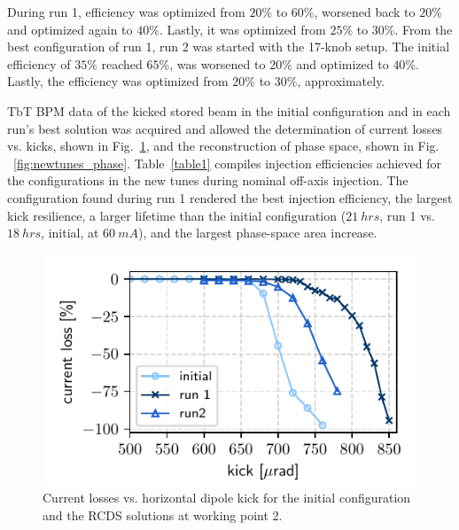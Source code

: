 \documentclass[a4paper,
               keeplastbox,   %
               ]{jacow}
\begin{document}
 During run 1, efficiency was optimized from $20\%$ to $60\%$, worsened back to $20\%$ and optimized again to $40\%$. Lastly, it was optimized from $25\%$ to $30\%$. From the best configuration  of run 1, run 2 was started with the 17-knob setup. The initial efficiency of $35\%$ reached $65\%$, was worsened to $20\%$ and optimized to $40\%$. Lastly, the efficiency was optimized from $20\%$ to $30\%$, approximately.

TbT BPM data of the kicked stored beam  in the initial configuration and in each run's best solution was acquired and allowed the determination of current losses vs. kicks, shown in Fig.~\ref{fig:loss_kicks_newtunes}, and the reconstruction of phase space, shown in Fig. ~\ref{fig:newtunes_phase}. Table~\ref{table1} compiles injection efficiencies achieved for the configurations in the new tunes during nominal off-axis injection. The configuration found during run 1 rendered the best injection efficiency, the largest kick resilience, a larger lifetime than the initial configuration ($21~\unit{hrs}$, run 1 vs. $18~\unit{hrs}$, initial, at $60~\unit{mA}$), and the largest phase-space area increase.
\begin{figure}[!h]
   \includegraphics[width=\columnwidth]{WEPL087_f3.pdf}
   \caption{Current losses vs. horizontal dipole kick for the initial configuration and the RCDS solutions at working point 2.}
   \label{fig:loss_kicks_newtunes}
\end{figure}
\end{document}
